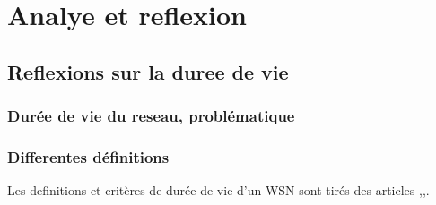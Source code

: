 
\chapter{Analye et reflexion}\label{Analyse_et_reflexion}






\section{Reflexions sur la duree de vie}
\subsection{Durée de vie du reseau, problématique}
\subsection{Differentes définitions}
Les definitions et critères de durée de vie d'un WSN sont tirés des articles \cite{Dietrich2009},\cite{Champ2009lifetime},\cite{Elleithy2011}.

